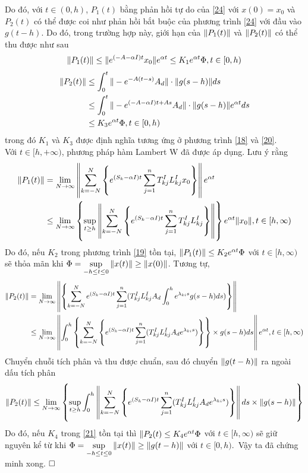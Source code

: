 \begin{cm}
Do đó, với $t \in (0,h)$, $P_1(t)$ bằng phản hồi tự do của \eqref{24} với $x(0) =x_0$ và $P_2(t)$ có thể được coi như phản hồi bắt buộc của phương trình \eqref{24} với đầu vào $g(t-h)$. Do đó,  trong trường hợp này, giới hạn của $\Vert P_1(t) \Vert$ và $\Vert P_2(t) \Vert$ có thể thu được như sau
\begin{align}\label{25}
	\Vert P_1(t) \Vert \le \Vert e^{(-A - \alpha I)t}x_0 \Vert e^{\alpha t} \le K_1 e^{\alpha t}\Phi, t \in [0,h)
\end{align}
\begin{align}\label{26}
	\Vert P_2(t) \Vert &\le \int_{0}^{t}\Vert -e^{-A(t-s )}A_d \Vert \cdot \Vert g(s  - h) \Vert ds  \notag\\
	&\le \int_{0}^{t}\Vert -e^{(-A - \alpha I)t + As }A_d \Vert \cdot \Vert g(s  - h) \Vert e^{\alpha t}ds  \notag\\
	&\le K_3e^{\alpha t}	\Phi, t \in [0,h)
\end{align}
trong đó $K_1$ và $K_3$ được định nghĩa tương ứng ở phương trình \eqref{18} và \eqref{20}.\\
Với $t\in [h,+\infty)$, phương pháp hàm Lambert W đã được áp dụng. Lưu ý rằng
\begin{align}\label{27}
	\Vert P_1(t) \Vert &= \lim\limits_{N \to \infty} \left \Vert \sum_{k=-N}^{N} \left\{ e^{(S_k-\alpha I)t} \sum_{j =1}^n T^I_{kj}L^I_{kj}x_0\right\} \right \Vert e^{\alpha t} \notag\\
	& \le \lim \limits_{N \to \infty} \left\{ \sup \limits_{t \ge h} \left \Vert \sum_{k=-N}^{N} \left\{ e^{(S_k - \alpha I)t} \sum_{j =1}^n T^I_{kj} L^I_{kj}\right\} \right \Vert\right\} e^{\alpha t} \Vert x_0 \Vert, t \in [h,\infty)
\end{align}
Do đó, nếu $K_2$ trong phương trình \eqref{19} tồn tại, $\Vert P_1(t) \Vert \le K_2 e^{\alpha t} \Phi$ với $t \in [h,\infty)$ sẽ thỏa mãn khi $\Phi = \sup \limits_{-h \le t \le 0} \Vert x(t)\Vert \ge \Vert x(0)\Vert$. Tương tự,
\begin{align}\label{28}
	\Vert P_2(t)\Vert &= \lim\limits_{N \to \infty} \left \Vert \left\{  \sum_{k=-N}^N e^{(S_k - \alpha I)t} \sum_{j =1}^n (T^I_{kj}L^I_{kj}A_d \int_0^h e^{\lambda_{ki}s } g(s  - h) ds )  \right\} \right \Vert \notag\\
	& \le \lim\limits_{N\to \infty} \left \Vert \int_0^h \left\{ \sum_{k=-N}^N \left\{ e^{(S_k - \alpha I)t} \sum_{j=1}^n (T^I_{kj} L^I_{kj}A_de^{\lambda_{ki}s })\right\}\right\} \times g(s  - h) d s  \right \Vert e^{\alpha t}, t \in [h,\infty)
	\end{align}
Chuyển chuỗi tích phân và thu được chuẩn, sau đó chuyển $\Vert g(t-h)\Vert$ ra ngoài dấu tích phân
\begin{align}\label{29}
	\Vert P_2(t) \Vert \le \lim \limits_{N\to \infty} \left \{ \sup \limits_{t \ge h} \int_0^h \left \Vert \sum_{k=-N}^N \left\{ e^{(S_k - \alpha I)t} \sum_{j =1}^n (T^I_{kj}L^I_{kj}A_de^{\lambda_{ki}s })\right\} \right \Vert ds  \times \Vert g(s  - h)\Vert \right\}
\end{align}
Do đó, nếu $K_4$ trong \eqref{21} tồn tại thì $\Vert P_2(t) \le K_4e^{\alpha t} \Phi$ với $t \in [h,\infty)$ sẽ giữ nguyên kể từ khi $\Phi = \sup \limits_{-h \le t \le 0} \Vert x(t) \Vert \ge \Vert g(t-h)\Vert$ với $t \in [0,h)$.\ 
Vậy ta đã chứng minh xong. $\hfill \square$
\end{cm}

